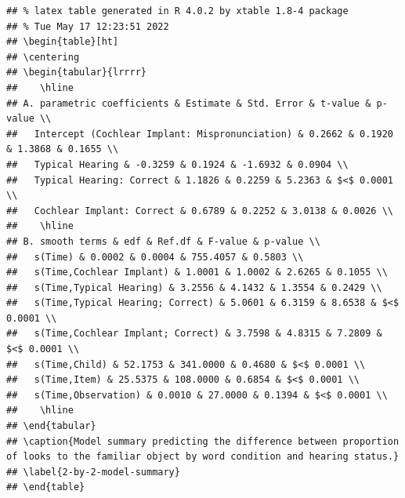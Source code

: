 \documentclass[
]{article}
\begin{document}
\begin{verbatim}
## % latex table generated in R 4.0.2 by xtable 1.8-4 package
## % Tue May 17 12:23:51 2022
## \begin{table}[ht]
## \centering
## \begin{tabular}{lrrrr}
##    \hline
## A. parametric coefficients & Estimate & Std. Error & t-value & p-value \\ 
##   Intercept (Cochlear Implant: Mispronunciation) & 0.2662 & 0.1920 & 1.3868 & 0.1655 \\ 
##   Typical Hearing & -0.3259 & 0.1924 & -1.6932 & 0.0904 \\ 
##   Typical Hearing: Correct & 1.1826 & 0.2259 & 5.2363 & $<$ 0.0001 \\ 
##   Cochlear Implant: Correct & 0.6789 & 0.2252 & 3.0138 & 0.0026 \\ 
##    \hline
## B. smooth terms & edf & Ref.df & F-value & p-value \\ 
##   s(Time) & 0.0002 & 0.0004 & 755.4057 & 0.5803 \\ 
##   s(Time,Cochlear Implant) & 1.0001 & 1.0002 & 2.6265 & 0.1055 \\ 
##   s(Time,Typical Hearing) & 3.2556 & 4.1432 & 1.3554 & 0.2429 \\ 
##   s(Time,Typical Hearing; Correct) & 5.0601 & 6.3159 & 8.6538 & $<$ 0.0001 \\ 
##   s(Time,Cochlear Implant; Correct) & 3.7598 & 4.8315 & 7.2809 & $<$ 0.0001 \\ 
##   s(Time,Child) & 52.1753 & 341.0000 & 0.4680 & $<$ 0.0001 \\ 
##   s(Time,Item) & 25.5375 & 108.0000 & 0.6854 & $<$ 0.0001 \\ 
##   s(Time,Observation) & 0.0010 & 27.0000 & 0.1394 & $<$ 0.0001 \\ 
##    \hline
## \end{tabular}
## \caption{Model summary predicting the difference between proportion of looks to the familiar object by word condition and hearing status.} 
## \label{2-by-2-model-summary}
## \end{table}
\end{verbatim}
\end{document}
